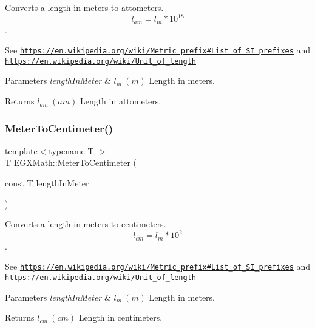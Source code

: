 Converts a length in meters to attometers. \[ l_{am}=l_{m} * 10^{18} \]. 

See \href{https://en.wikipedia.org/wiki/Metric_prefix#List_of_SI_prefixes}{\tt https\+://en.\+wikipedia.\+org/wiki/\+Metric\+\_\+prefix\#\+List\+\_\+of\+\_\+\+S\+I\+\_\+prefixes} and \href{https://en.wikipedia.org/wiki/Unit_of_length}{\tt https\+://en.\+wikipedia.\+org/wiki/\+Unit\+\_\+of\+\_\+length} 
\begin{DoxyParams}{Parameters}
{\em length\+In\+Meter} & $ l_{m}\ (m)$ Length in meters. \\
\hline
\end{DoxyParams}
\begin{DoxyReturn}{Returns}
$ l_{am}\ (am)$ Length in attometers. 
\end{DoxyReturn}
\mbox{\label{group___e_g_x_math-_conversions-_length_conversions-_s_i-_meter-_s_i_gab70c34d0ee4bf48225d48e48b28f808a}} 
\subsubsection{\texorpdfstring{Meter\+To\+Centimeter()}{MeterToCentimeter()}}
{\footnotesize\ttfamily template$<$typename T $>$ \\
T E\+G\+X\+Math\+::\+Meter\+To\+Centimeter (\begin{DoxyParamCaption}\item[{const T}]{length\+In\+Meter }\end{DoxyParamCaption})}



Converts a length in meters to centimeters. \[ l_{cm}=l_{m} * 10^{2} \]. 

See \href{https://en.wikipedia.org/wiki/Metric_prefix#List_of_SI_prefixes}{\tt https\+://en.\+wikipedia.\+org/wiki/\+Metric\+\_\+prefix\#\+List\+\_\+of\+\_\+\+S\+I\+\_\+prefixes} and \href{https://en.wikipedia.org/wiki/Unit_of_length}{\tt https\+://en.\+wikipedia.\+org/wiki/\+Unit\+\_\+of\+\_\+length} 
\begin{DoxyParams}{Parameters}
{\em length\+In\+Meter} & $ l_{m}\ (m)$ Length in meters. \\
\hline
\end{DoxyParams}
\begin{DoxyReturn}{Returns}
$ l_{cm}\ (cm)$ Length in centimeters. 
\end{DoxyReturn}
\mbox{\label{group___e_g_x_math-_conversions-_length_conversions-_s_i-_meter-_s_i_ga1b18e63d03025512566c5f55ad4e0c89}} 
